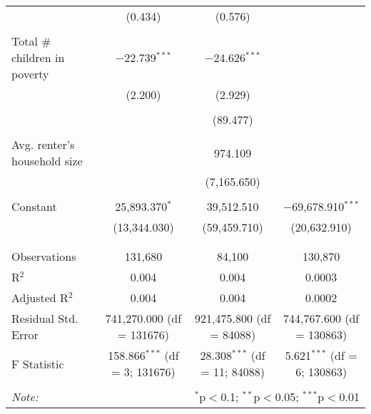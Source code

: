 \begin{table}[!htbp]
\begin{tabular}{@{\extracolsep{5pt}}lccc}
  & (0.434) & (0.576) &  \\ 
  & & & \\ 
 Total # children in poverty & $-$22.739$^{***}$ & $-$24.626$^{***}$ &  \\ 
  & (2.200) & (2.929) &  \\ 
  & & & \\ 
  &  & (89.477) &  \\ 
  & & & \\ 
 Avg. renter's household size &  & 974.109 &  \\ 
  &  & (7,165.650) &  \\ 
  & & & \\ 
 Constant & 25,893.370$^{*}$ & 39,512.510 & $-$69,678.910$^{***}$ \\ 
  & (13,344.030) & (59,459.710) & (20,632.910) \\ 
  & & & \\ 
\hline \\[-1.8ex] 
Observations & 131,680 & 84,100 & 130,870 \\ 
R$^{2}$ & 0.004 & 0.004 & 0.0003 \\ 
Adjusted R$^{2}$ & 0.004 & 0.004 & 0.0002 \\ 
Residual Std. Error & 741,270.000 (df = 131676) & 921,475.800 (df = 84088) & 744,767.600 (df = 130863) \\ 
F Statistic & 158.866$^{***}$ (df = 3; 131676) & 28.308$^{***}$ (df = 11; 84088) & 5.621$^{***}$ (df = 6; 130863) \\ 
\hline 
\hline \\[-1.8ex] 
\textit{Note:}  & \multicolumn{3}{r}{$^{*}$p$<$0.1; $^{**}$p$<$0.05; $^{***}$p$<$0.01} \\ 
\end{tabular} 
\end{table} 

